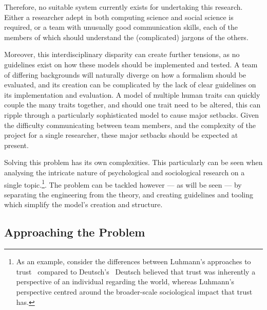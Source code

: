 Therefore, no suitable system currently exists for undertaking this research. Either a researcher adept in both computing science and social science is required, or a team with unusually good communication skills, each of the members of which should understand the (complicated) jargons of the others.\par

Moreover, this interdisciplinary disparity can create further tensions, as no guidelines exist on how these models should be implemented and tested. A team of differing backgrounds will naturally diverge on how a formalism should be evaluated, and its creation can be complicated by the lack of clear guidelines on its implementation and evaluation. A model of multiple human traits can quickly couple the many traits together, and should one trait need to be altered, this can ripple through a particularly sophisticated model to cause major setbacks. Given the difficulty communicating between team members, and the complexity of the project for a single researcher, these major setbacks should be expected at present.\par

Solving this problem has its own complexities. This particularly can be seen when analysing the intricate nature of psychological and sociological research on a single topic.\footnote{As an example, consider the differences between Luhmann's approaches to trust~\cite{luhmann2000familiarity} compared to Deutsch's~\cite{deutsch1962cooperation} Deutsch believed that trust was inherently a perspective of an individual regarding the world, whereas Luhmann's perspective centred around the broader-scale sociological impact that trust has.}. The problem can be tackled however --- as will be seen --- by separating the engineering from the theory, and creating guidelines and tooling which simplify the model's creation and structure.\par
\subsection{Approaching the Problem}\label{sec:approaching_the_problem}

